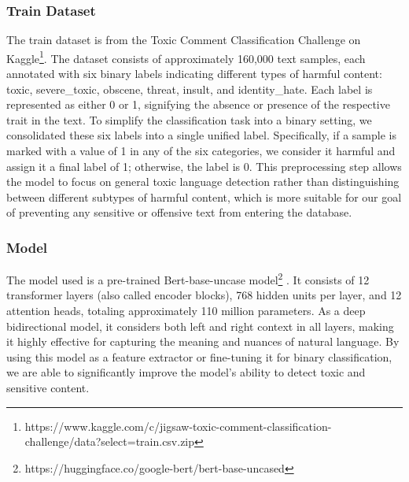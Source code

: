 \documentclass{article}
\begin{document}
\subsubsection{Train Dataset}
The train dataset is from the Toxic Comment Classification Challenge on Kaggle\footnote{https://www.kaggle.com/c/jigsaw-toxic-comment-classification-challenge/data?select=train.csv.zip}. The dataset consists of approximately 160,000 text samples, each annotated with six binary labels indicating different types of harmful content: toxic, severe\_toxic, obscene, threat, insult, and identity\_hate. Each label is represented as either 0 or 1, signifying the absence or presence of the respective trait in the text. To simplify the classification task into a binary setting, we consolidated these six labels into a single unified label. Specifically, if a sample is marked with a value of 1 in any of the six categories, we consider it harmful and assign it a final label of 1; otherwise, the label is 0. This preprocessing step allows the model to focus on general toxic language detection rather than distinguishing between different subtypes of harmful content, which is more suitable for our goal of preventing any sensitive or offensive text from entering the database. 

\subsubsection{Model}
The model used is a pre-trained Bert-base-uncase model\footnote{https://huggingface.co/google-bert/bert-base-uncased } \cite{devlin2018bert}. It consists of 12 transformer layers (also called encoder blocks), 768 hidden units per layer, and 12 attention heads, totaling approximately 110 million parameters. As a deep bidirectional model, it considers both left and right context in all layers, making it highly effective for capturing the meaning and nuances of natural language. By using this model as a feature extractor or fine-tuning it for binary classification, we are able to significantly improve the model’s ability to detect toxic and sensitive content.
\end{document}
